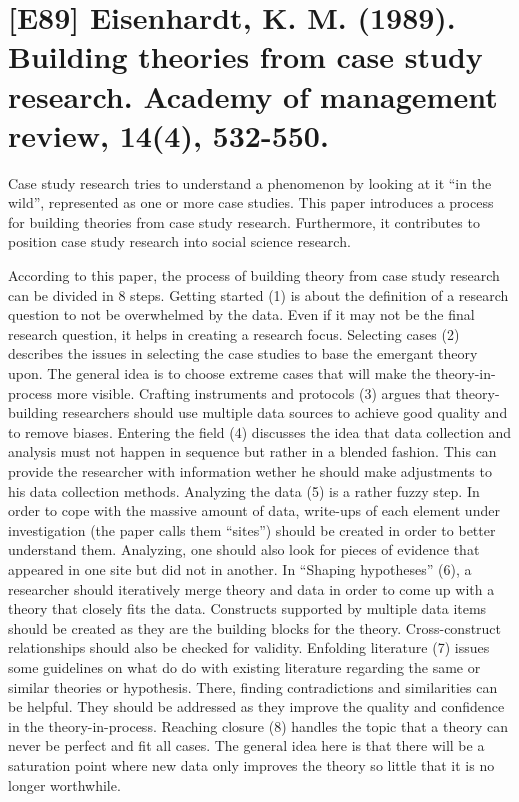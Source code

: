 \documentclass[a4paper,12pt,english]{scrartcl}
\newcommand{\papertitle}[2]{
	\section{[#1] #2}
}
\begin{document}
\pagestyle{fancy} %

\papertitle{E89}{Eisenhardt, K. M. (1989). Building theories from case study research. Academy of management review, 14(4), 532-550.}


Case study research tries to understand a phenomenon by looking at it \enquote{in the wild}, represented as one or more case studies. This paper introduces a process for building theories from case study research. Furthermore, it contributes to position case study research into social science research.

According to this paper, the process of building theory from case study research can be divided in 8 steps. Getting started (1) is about the definition of a research question to not be overwhelmed by the data. Even if it may not be the final research question, it helps in creating a research focus. Selecting cases (2) describes the issues in selecting the case studies to base the emergant theory upon. The general idea is to choose extreme cases that will make the theory-in-process more visible. Crafting instruments and protocols (3) argues that theory-building researchers should use multiple data sources to achieve good quality and to remove biases. Entering the field (4) discusses the idea that data collection and analysis must not happen in sequence but rather in a blended fashion. This can provide the researcher with information wether he should make adjustments to his data collection methods. Analyzing the data (5) is a rather fuzzy step. In order to cope with the massive amount of data, write-ups of each element under investigation (the paper calls them \enquote{sites}) should be created in order to better understand them. Analyzing, one should also look for pieces of evidence that appeared in one site but did not in another. In \enquote{Shaping hypotheses} (6), a researcher should iteratively merge theory and data in order to come up with a theory that closely fits the data. Constructs supported by multiple data items should be created as they are the building blocks for the theory. Cross-construct relationships should also be checked for validity. Enfolding literature (7) issues some guidelines on what do do with existing literature regarding the same or similar theories or hypothesis. There, finding contradictions and similarities can be helpful. They should be addressed as they improve the quality and confidence in the theory-in-process. Reaching closure (8) handles the topic that a theory can never be perfect and fit all cases. The general idea here is that there will be a saturation point where new data only improves the theory so little that it is no longer worthwhile.
\end{document}
